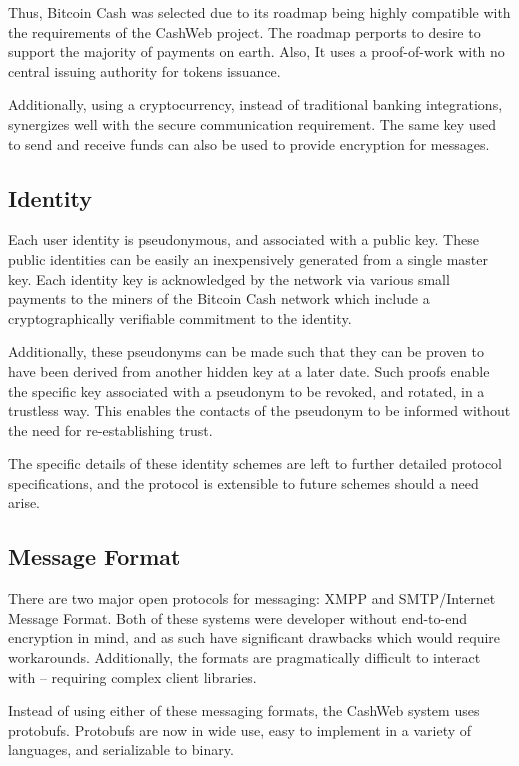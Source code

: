 \documentclass{article}
\theoremstyle{definition}
\begin{document}
Thus,  Bitcoin Cash was selected due to its roadmap being highly compatible with the requirements of the CashWeb project. The roadmap perports to desire to support the majority of payments on earth. Also, It uses a proof-of-work with no central issuing authority for tokens issuance.

Additionally, using a cryptocurrency, instead of traditional banking integrations, synergizes well with the secure communication requirement. The same key used to send and receive funds can also be used to provide encryption for messages.

\subsection{Identity}

Each user identity is pseudonymous, and associated with a public key.  These public identities can be easily an inexpensively generated from a single master key. Each identity key is acknowledged by the network via various small payments to the miners of the Bitcoin Cash network which include a cryptographically verifiable commitment to the identity.

Additionally, these pseudonyms can be made such that they can be proven to have been derived from another hidden key at a later date. Such proofs enable the specific key associated with a pseudonym to be revoked, and rotated, in a trustless way. This enables the contacts of the pseudonym to be informed without the need for re-establishing trust.

The specific details of these identity schemes are left to further detailed protocol specifications, and the protocol is extensible to future schemes should a need arise.

\subsection{Message Format}

There are two major open protocols for messaging: XMPP and SMTP/Internet Message Format. Both of these systems were developer without end-to-end encryption in mind, and as such have significant drawbacks which would require workarounds. Additionally, the formats are  pragmatically difficult to interact with -- requiring complex client libraries.

Instead of using either of these messaging formats, the CashWeb system uses protobufs. Protobufs are now in wide use, easy to implement in a variety of languages, and serializable to binary.
\end{document}
